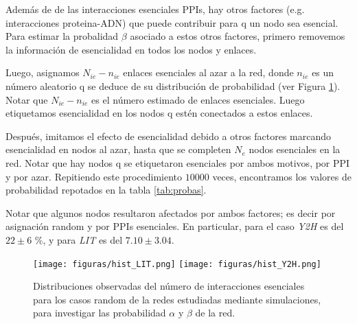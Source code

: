 Adem\'as de de las interacciones esenciales PPIs, hay otros factores (e.g. interacciones proteina-ADN) que puede contribuir para q un nodo sea esencial.
Para estimar la probalidad $\beta$ asociado a estos otros factores, primero removemos la informaci\'on de esencialidad en todos los nodos y enlaces.

Luego, asignamos $N_{ie} - n_{ie}$ enlaces esenciales al azar a la red, donde $n_{ie}$ es un n\'umero aleatorio q se deduce de su distribuci\'on de probabilidad (ver Figura \ref{fig:hist_simulaciones}).
Notar que $N_{ie}-n_{ie}$ es el n\'umero estimado de enlaces esenciales.
Luego etiquetamos esencialidad en los nodos q est\'en conectados a estos enlaces.

Despu\'es, imitamos el efecto de esencialidad debido a otros factores marcando esencialidad en nodos al azar, hasta que se completen $N_e$ nodos esenciales en la red.
Notar que hay nodos q se etiquetaron esenciales por ambos motivos, por PPI y por azar.
Repitiendo este procedimiento $10000$ veces, encontramos los valores de probabilidad repotados en la tabla \ref{tab:probas}.


Notar que algunos nodos resultaron afectados por ambos factores; es decir por asignaci\'on random y por PPIs esenciales. 
En particular, para el caso {\it Y2H} es del $22 \pm 6$ \%, y para {\it LIT} es del $7.10 \pm 3.04$.

\begin{figure}
\centering
\texttt{[image: figuras/hist\_LIT.png]} 
\texttt{[image: figuras/hist\_Y2H.png]} \\
\caption{Distribuciones observadas del n\'umero de interacciones esenciales para los casos random de la redes estudiadas mediante simulaciones, para investigar las probabilidad $\alpha$ y $\beta$ de la red.}
\label{fig:hist_simulaciones}
\end{figure}

